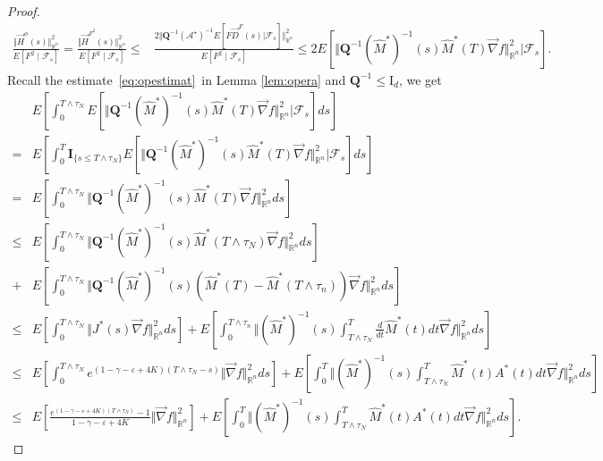 \documentclass[11pt]{article}
\numberwithin{equation}{section}%
\numberwithin{figure}{section}%
\theoremstyle{remark}
\begin{document}
\begin{proof}
\begin{align*}
			\frac{\Vert \vec{H}^{\phi}(s)\Vert^{2}_{\mathbb{R}^{n}}}{E[F^{2}\mid \mathcal{F}_{s}]}=\frac{\Vert \vec{H}^{F^{2}}(s)\Vert^{2}_{\mathbb{R}^{n}}}{E[F^{2}\mid \mathcal{F}_{s}]}\leq& \frac{2\Vert\mathbf{Q}^{-1}(\mathcal{A}^{\star})^{-1} E[F\vec{D}^{F}(s)|\mathcal{F}_{s}]\Vert^{2}_{\mathbb{R}^{n}}}{E[F^{2}\mid \mathcal{F}_{s}]}
			\leq2E\left[\Vert\mathbf{Q}^{-1}(\hat{M}^{*})^{-1}(s)\hat{M}^{*}(T)\vec{\nabla}f\Vert^{2}_{\mathbb{R}^{n}}|\mathcal{F}_{s}\right].
		\end{align*}
		Recall the estimate~\eqref{eq:opestimat}~in Lemma \ref{lem:opera} and $\mathbf{Q}^{-1}\leq \text{I}_{d}$, we get
		\begin{align*}
			&E\left[\int_{0}^{T\wedge\tau_{N}}E\left[\Vert\mathbf{Q}^{-1}(\hat{M}^{*})^{-1}(s)\hat{M}^{*}(T)\vec{\nabla}f\Vert^{2}_{\mathbb{R}^{n}}|\mathcal{F}_{s}\right]ds\right]\\
			=&	E\left[\int_{0}^{T}\textbf{I}_{\{s\leq T\wedge\tau_{N}\}}E\left[\Vert\mathbf{Q}^{-1}(\hat{M}^{*})^{-1}(s)\hat{M}^{*}(T)\vec{\nabla}f\Vert^{2}_{\mathbb{R}^{n}}|\mathcal{F}_{s}\right]ds\right]\\		
			=&	E\left[\int_{0}^{ T\wedge\tau_{N}}\Vert\mathbf{Q}^{-1}(\hat{M}^{*})^{-1}(s)\hat{M}^{*}(T)\vec{\nabla}f\Vert^{2}_{\mathbb{R}^{n}}ds\right]\\	
			\leq&E\left[\int_{0}^{T\wedge\tau_{N}}\Vert\mathbf{Q}^{-1}(\hat{M}^{*})^{-1}(s)\hat{M}^{*}(T\wedge\tau_{N})\vec{\nabla}f\Vert^{2}_{\mathbb{R}^{n}}ds\right]\\
			+&E\left[\int_{0}^{T\wedge\tau_{N}}\Vert\mathbf{Q}^{-1}(\hat{M}^{*})^{-1}(s)\left(\hat{M}^{*}(T)-\hat{M}^{*}(T\wedge\tau_{n})\right)\vec{\nabla}f\Vert^{2}_{\mathbb{R}^{n}}ds\right]\\
			\leq&E\left[\int_{0}^{T\wedge\tau_{N}}\Vert J^{*}(s)\vec{\nabla}f\Vert^{2}_{\mathbb{R}^{n}}ds\right]+E\left[\int_{0}^{T\wedge\tau_{n}}\Vert(\hat{M}^{*})^{-1}(s)\int_{T\wedge\tau_{N}}^{T}\frac{d}{dt}\hat{M}^{*}(t)dt\vec{\nabla}f\Vert^{2}_{\mathbb{R}^{n}}ds\right]\\
			\leq&E\left[\int_{0}^{T\wedge\tau_{N}}e^{(1-\gamma-\varepsilon+4K)(T\wedge\tau_{N}-s)}\Vert \vec{\nabla}f\Vert^{2}_{\mathbb{R}^{n}}ds\right]+E\left[\int_{0}^{T}\Vert(\hat{M}^{*})^{-1}(s)\int_{T\wedge\tau_{N}}^{T}\hat{M}^{*}(t)A^{*}(t)dt\vec{\nabla}f\Vert^{2}_{\mathbb{R}^{n}}ds\right]\\
			\leq&E\left[\frac{e^{(1-\gamma-\varepsilon+4K)(T\wedge\tau_{N})}-1}{1-\gamma-\varepsilon+4K}\Vert \vec{\nabla}f\Vert^{2}_{\mathbb{R}^{n}}\right]+E\left[\int_{0}^{T}\Vert(\hat{M}^{*})^{-1}(s)\int_{T\wedge\tau_{N}}^{T}\hat{M}^{*}(t)A^{*}(t)dt\vec{\nabla}f\Vert^{2}_{\mathbb{R}^{n}}ds\right].

\end{align*}
\end{proof}
\end{document}
